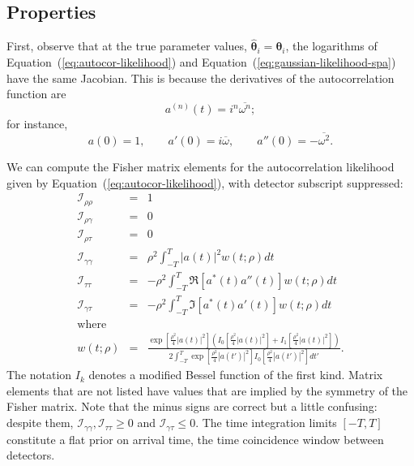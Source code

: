 \documentclass[amsmath,amssymb,aps,prx,reprint,nopreprintnumbers,nofootinbib]{revtex4-1}
\begin{document}
\subsection{Properties}

First, observe that at the true parameter values, $\hat{\bm\theta}_i = \bm\theta_i$, the logarithms of Equation~(\ref{eq:autocor-likelihood}) and Equation~(\ref{eq:gaussian-likelihood-spa}) have the same Jacobian. This is because the derivatives of the autocorrelation function are
%
\begin{equation*}
    a^{(n)}(t) = i^n \overline{\omega^n};
\end{equation*}
%
for instance,
%
\begin{equation*}
    a(0) = 1,
    \qquad
    a'(0) = i \overline{\omega},
    \qquad
    a''(0) = -\overline{\omega^2}.
\end{equation*}

We can compute the Fisher matrix elements for the autocorrelation likelihood given by Equation~(\ref{eq:autocor-likelihood}), with detector subscript suppressed:
%
\begin{eqnarray}
    \nonumber
    \mathcal{I}_{\rho\rho} &=& 1 \\
    \nonumber
    \mathcal{I}_{\rho\gamma} &=& 0 \\
    \nonumber
    \mathcal{I}_{\rho\tau} &=& 0 \\
    \label{eq:fisher-autocor-gamma-gamma}
    \mathcal{I}_{\gamma\gamma} &=& \rho^2
        \int_{-T}^T \left|a(t)\right|^2 w(t; \rho) dt \\
    \label{eq:fisher-autocor-tau-tau}
    \mathcal{I}_{\tau\tau} &=& -\rho^2
        \int_{-T}^T \Re\left[a^*(t) a''(t)\right] w(t; \rho) dt \\
    \label{eq:fisher-autocor-gamma-tau}
    \mathcal{I}_{\gamma\tau} &=& -\rho^2
        \int_{-T}^T \Im\left[a^*(t) a'(t)\right] w(t; \rho) dt \\
    \nonumber\textrm{where} && \\
    w(t; \rho) &=& \frac{
        \displaystyle
        \exp\left[\frac{\rho^2}{4}\left|a(t)\right|^2\right]
        \left(
        I_0\left[\frac{\rho^2}{4}\left|a(t)\right|^2\right] +
        I_1\left[\frac{\rho^2}{4}\left|a(t)\right|^2\right]
        \right)
    }{
        \displaystyle
        2 \int_{-T}^T
        \exp\left[\frac{\rho^2}{4}\left|a(t')\right|^2\right]
        I_0\left[\frac{\rho^2}{4}\left|a(t')\right|^2\right]
        dt'
    }.
\end{eqnarray}
%
The notation $I_k$ denotes a modified Bessel function of the first kind. Matrix elements that are not listed have values that are implied by the symmetry of the Fisher matrix. Note that the minus signs are correct but a little confusing: despite them, $\mathcal{I}_{\gamma\gamma}, \mathcal{I}_{\tau\tau} \geq 0$ and $\mathcal{I}_{\gamma\tau} \leq 0$. The time integration limits $[-T, T]$ constitute a flat prior on arrival time, the time coincidence window between detectors.
\end{document}
